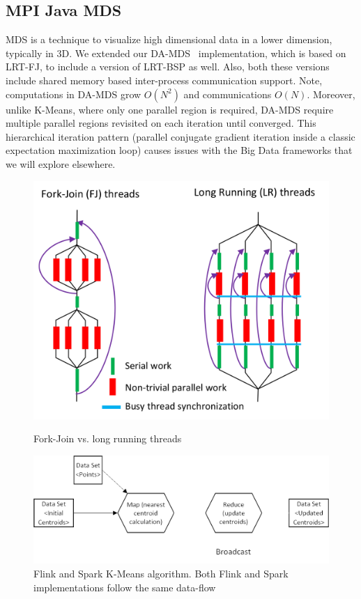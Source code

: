 \documentclass[10pt, conference, compsocconf]{IEEEtran}
\begin{document}
\subsection{MPI Java \ac{MDS}}
\ac{MDS} is a technique to visualize high dimensional data in a lower dimension, typically in 3D. We extended our \ac{DA-MDS}~\cite{hpc2016:spidaljava} implementation, which is based on \ac{LRT-FJ}, to include a version of \ac{LRT-BSP} as well. Also, both these versions include shared memory based inter-process communication support. Note, computations in \ac{DA-MDS} grow $O(N^2)$ and communications $O(N)$. Moreover, unlike K-Means, where only one parallel region is required, \ac{DA-MDS} require multiple parallel regions revisited on each iteration until converged. This hierarchical iteration pattern (parallel conjugate gradient iteration inside a classic expectation maximization loop) causes issues with the Big Data frameworks that we will explore elsewhere.


\begin{figure}[!htb]
    \centering
    \begin{minipage}{.49\textwidth}
        \centering        
        \includegraphics[width=0.8\columnwidth]{images/fig_fj_vs_lrt}
        \caption{Fork-Join vs. long running threads}
        \label{fig:fig_fj_vs_lrt}
    \end{minipage}
    \hspace{1.4mm}
    \begin{minipage}{0.49\textwidth}
        \centering
        \includegraphics[width=1\columnwidth]{images/fig_kmeans_dataflow}
        \caption{Flink and Spark K-Means algorithm. Both Flink and Spark implementations follow the same data-flow}
        \label{fig:fig_flink_kmeans}
    \end{minipage}   
\end{figure}
\end{document}
